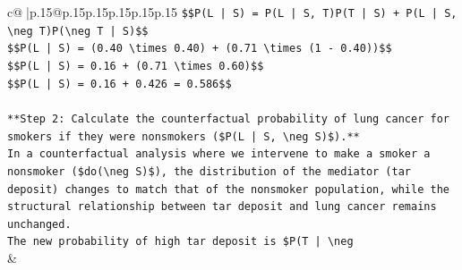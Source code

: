 \documentclass{article}
\begin{document}
{\begin{supertabular}{c@{$\;$}|p{.15\linewidth}@{}p{.15\linewidth}p{.15\linewidth}p{.15\linewidth}p{.15\linewidth}p{.15\linewidth}}
{{{\texttt{\$\$P(L | S) = P(L | S, T)P(T | S) + P(L | S, \textbackslash{}neg T)P(\textbackslash{}neg T | S)\$\$} \\
\texttt{\$\$P(L | S) = (0.40 \textbackslash{}times 0.40) + (0.71 \textbackslash{}times (1 {-} 0.40))\$\$} \\
\texttt{\$\$P(L | S) = 0.16 + (0.71 \textbackslash{}times 0.60)\$\$} \\
\texttt{\$\$P(L | S) = 0.16 + 0.426 = 0.586\$\$} \\
\\ 
\texttt{**Step 2: Calculate the counterfactual probability of lung cancer for smokers if they were nonsmokers (\$P(L | S, \textbackslash{}neg S)\$).**} \\
\texttt{In a counterfactual analysis where we intervene to make a smoker a nonsmoker (\$do(\textbackslash{}neg S)\$), the distribution of the mediator (tar deposit) changes to match that of the nonsmoker population, while the structural relationship between tar deposit and lung cancer remains unchanged.} \\
\texttt{The new probability of high tar deposit is \$P(T | \textbackslash{}neg} \\
            }
        }
    }
    & \\ \\


\end{supertabular}}
\end{document}
